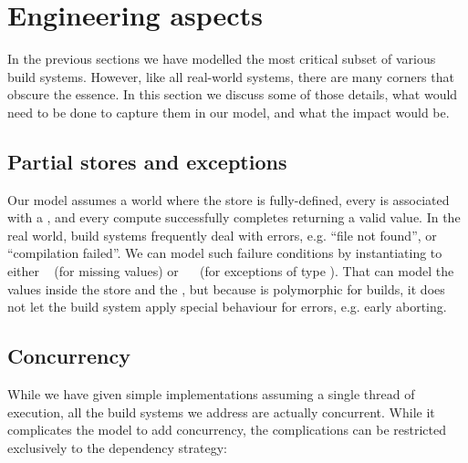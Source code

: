\section{Engineering aspects}\label{sec-engineering}

In the previous sections we have modelled the most critical subset of various
build systems. However, like all real-world systems, there are many corners that
obscure the essence. In this section we discuss some of those details, what
would need to be done to capture them in our model, and what the impact would be.

\subsection{Partial stores and exceptions}

Our model assumes a world where the store is fully-defined, every  is
associated with a , and every compute successfully completes returning a
valid value. In the real world, build systems frequently deal with errors, e.g.
``file not found'', or ``compilation failed''. We can model such failure
conditions by instantiating  to either ~ (for missing
values) or ~~ (for exceptions of type ). That can
model the values inside the store and the , but because  is
polymorphic for builds, it does not let the build system apply special behaviour
for errors, e.g. early aborting.


\subsection{Concurrency}\label{sec-concurrency}

While we have given simple implementations assuming a single thread of execution,
all the build systems we address are actually concurrent. While it complicates
the model to add concurrency, the complications can be restricted exclusively
to the dependency strategy:

